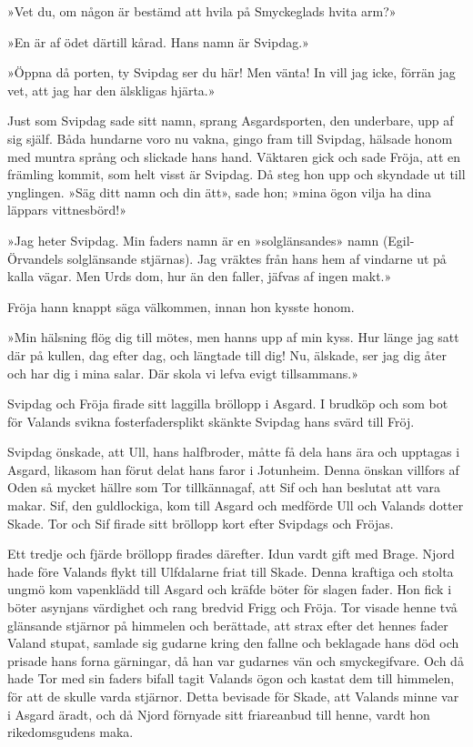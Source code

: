 »Vet du, om någon är bestämd att hvila på Smyckeglads hvita arm?»

»En är af ödet därtill kårad. Hans namn är Svipdag.»

»Öppna då porten, ty Svipdag ser du här! Men vänta! In vill jag icke,
förrän jag vet, att jag har den älskligas hjärta.»

Just som Svipdag sade sitt namn, sprang Asgardsporten, den underbare,
upp af sig själf. Båda hundarne voro nu vakna, gingo fram till Svipdag,
hälsade honom med muntra språng och slickade hans hand. Väktaren gick
och sade Fröja, att en främling kommit, som helt visst är Svipdag. Då
steg hon upp och skyndade ut till ynglingen. »Säg ditt
namn och din ätt», sade hon; »mina ögon vilja ha dina läppars
vittnesbörd!»

»Jag heter Svipdag. Min faders namn är en »solglänsandes» namn
(Egil-Örvandels solglänsande stjärnas). Jag vräktes från hans hem af
vindarne ut på kalla vägar. Men Urds dom, hur än den faller, jäfvas af
ingen makt.»

Fröja hann knappt säga välkommen, innan hon kysste honom.

»Min hälsning flög dig till mötes, men hanns upp af min kyss. Hur länge
jag satt där på kullen, dag efter dag, och längtade till dig! Nu,
älskade, ser jag dig åter och har dig i mina salar. Där skola vi lefva
evigt tillsammans.»

\sectionbreak

Svipdag och Fröja firade sitt laggilla bröllopp i Asgard. I brudköp och
som bot för Valands svikna fosterfadersplikt skänkte Svipdag hans svärd
till Fröj.

Svipdag önskade, att Ull, hans halfbroder, måtte få dela hans ära och
upptagas i Asgard, likasom han förut delat hans faror i Jotunheim. Denna
önskan villfors af Oden så mycket hällre som Tor tillkännagaf, att Sif
och han beslutat att vara makar. Sif, den guldlockiga, kom till Asgard
och medförde Ull och Valands dotter Skade. Tor och Sif firade sitt
bröllopp kort efter Svipdags och Fröjas.

Ett tredje och fjärde bröllopp firades därefter. Idun vardt gift med
Brage. Njord hade före Valands flykt till Ulfdalarne friat till Skade.
Denna kraftiga och stolta ungmö kom vapenklädd till Asgard och kräfde
böter för slagen fader. Hon fick i böter asynjans värdighet och rang
bredvid Frigg och Fröja. Tor visade henne två glänsande stjärnor på
himmelen och berättade, att strax efter det hennes fader Valand stupat,
samlade sig gudarne kring den fallne och beklagade hans död och prisade
hans forna gärningar, då han var gudarnes vän och smyckegifvare. Och då
hade Tor med sin faders bifall tagit Valands ögon och kastat dem till
himmelen, för att de skulle varda stjärnor. Detta bevisade för Skade,
att Valands minne var i Asgard äradt, och då Njord förnyade sitt
friareanbud till henne, vardt hon rikedomsgudens maka.

